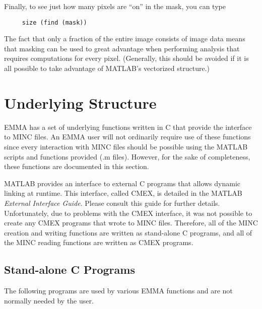 \documentclass[11pt]{article}
\begin{document}
Finally, to see just how many pixels are ``on'' in the mask, you can type
\begin{verbatim}
     size (find (mask))
\end{verbatim}
The fact that only a fraction of the entire image consists of image
data means that masking can be used to great advantage when
performing analysis that requires computations for every pixel.
(Generally, this should be avoided if it is all possible to take
advantage of MATLAB's vectorized structure.)

\newpage
\section{Underlying Structure}

EMMA has a set of underlying functions written in C that provide the
interface to MINC files.  An EMMA user will not ordinarily require
use of these functions since every interaction with MINC files should
be possible using the MATLAB scripts and functions provided (.m
files).  However, for the sake of completeness, these functions are
documented in this section.

MATLAB provides an interface to external C programs that allows
dynamic linking at runtime.  This interface, called CMEX, is detailed
in the MATLAB {\em External Interface Guide}.  Please consult this
guide for further details.  Unfortunately, due to problems with the
CMEX interface, it was not possible to create any CMEX programs that
wrote to MINC files.  Therefore, all of the MINC creation and writing
functions are written as stand-alone C programs, and all of the MINC
reading functions are written as CMEX programs.


\subsection {Stand-alone C Programs}

The following programs are used by various EMMA functions and are not
normally needed by the user.
\end{document}
